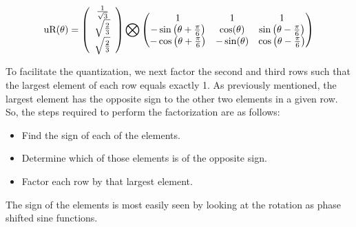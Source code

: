 \begin{equation}

\uR(\theta) =

\left(

\begin{array}{c}

 \frac{1}{\sqrt{3}} \\

 \sqrt{\frac{2}{3}}  \\

 \sqrt{\frac{2}{3}} \\

\end{array}

\right) \bigotimes

\begin{pmatrix}

 1 & 1 & 1 \\

 -\sin \left(\theta +\Pii{6}\right) &  \cos (\theta ) &  \sin \left(\theta -\Pii{6}\right) \\

 -\cos \left(\theta +\Pii{6}\right) & - \sin (\theta ) & \cos \left(\theta -\Pii{6}\right) \\

\end{pmatrix}

\end{equation}



To facilitate the quantization, we next factor the second and third rows such that the largest element of each row equals exactly 1. As previously mentioned, the largest element has the opposite sign to the other two elements in a given row. So, the steps required to perform the factorization are as follows:



\begin{itemize}

\item{Find the sign of each of the elements.}

\item{Determine which of those elements is of the opposite sign.}

\item{Factor each row by that largest element.}

\end{itemize}



The sign of the elements is most easily seen by looking at the rotation as phase shifted sine functions.

